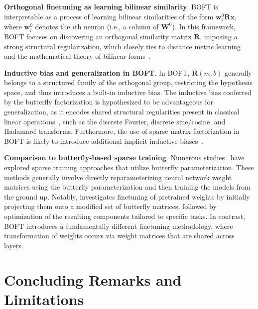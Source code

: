 \textbf{Orthogonal finetuning as learning bilinear similarity}. BOFT is interpretable as a process of learning bilinear similarities of the form $\bm{w}^0_i\bm{R}\bm{x}$, where $\bm{w}^0_i$ denotes the $i$th neuron (i.e., a column of $\bm{W}^0$). In this framework, BOFT focuses on discovering an orthogonal similarity matrix $\bm{R}$, imposing a strong structural regularization, which closely ties to distance metric learning~\cite{xing2002distance} and the mathematical theory of bilinear forms~\cite{roman2005advanced}.

\textbf{Inductive bias and generalization in BOFT}. In BOFT, $\bm{R}(m,b)$ generally belongs to a structured family of the orthogonal group, restricting the hypothesis space, and thus introduces a built-in inductive bias. The inductive bias conferred by the butterfly factorization is hypothesized to be advantageous for generalization, as it encodes shared structural regularities present in classical linear operations~\cite{dao2019kaleidoscope}, such as the discrete Fourier, discrete sine/cosine, and Hadamard transforms. Furthermore, the use of sparse matrix factorization in BOFT is likely to introduce additional implicit inductive biases~\cite{gunasekar2017implicit,li2018algorithmic,liu2019neural}.

\textbf{Comparison to butterfly-based sparse training}. Numerous studies~\cite{dao2019learning,dao2019kaleidoscope,chen2022pixelated,dao2022monarch} have explored sparse training approaches that utilize butterfly parameterization. These methods generally involve directly reparameterizing neural network weight matrices using the butterfly parameterization and then training the models from the ground up. Notably, \cite{dao2022monarch} investigates finetuning of pretrained weights by initially projecting them onto a modified set of butterfly matrices, followed by optimization of the resulting components tailored to specific tasks. In contrast, BOFT introduces a fundamentally different finetuning methodology, where transformation of weights occurs via weight matrices that are shared across layers.



\section{Concluding Remarks and Limitations}

